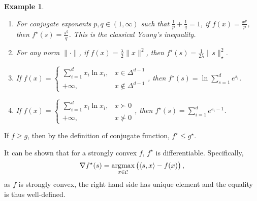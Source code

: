 \documentclass{article}
\newtheorem{example}{Example}
\DeclareMathOperator*{\Ccal}{{\cal C}}
\DeclareMathOperator*{\argmax}{{\rm argmax}}
\newcommand{\inner}[2]{\left\langle #1,#2 \right\rangle}
\begin{document}
\begin{example}
\begin{enumerate}
  \item For conjugate exponents $p, q \in (1,\infty)$ such that $\frac1p + \frac1q = 1$, if $f(x) = \frac{x^{p}}{p}$, then $f^\star(s) = \frac{s^q}{q}$. This is the classical Young's inequality.
  \item For any norm $\| \cdot \|$, if $f(x) = \frac\lambda2 \| x \|^2$, then $f^\star(s) = \frac1{2\lambda}\| s \|_\star^2$.
  \item If $f(x) = \begin{cases} \sum_{i=1}^d x_i \ln x_i, & x \in \Delta^{d-1} \\
   +\infty, & x \notin \Delta^{d-1} \end{cases}$, then $f^\star(s) = \ln \sum_{s=1}^d e^{s_i}$.
  \item If $f(x) = \begin{cases} \sum_{i=1}^d x_i \ln x_i, & x \succ 0 \\
   +\infty, & x \nsucc 0 \end{cases}$, then $f^\star(s) = \sum_{i=1}^d e^{s_i - 1}$.
\end{enumerate}
\end{example}


If $f \geq g$, then by the definition of conjugate function, $f^\star \leq g^\star$.

It can be shown that for a strongly convex $f$, $f^\star$ is differentiable. Specifically,
\[ \nabla f^\star(s) = \argmax_{x \in \Ccal} \del{\inner{s}{x} - f(x)}, \]
as $f$ is strongly convex, the right hand side has unique element and the equality
is thus well-defined.
\end{document}
